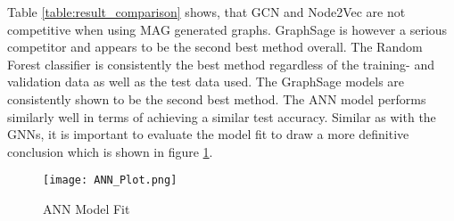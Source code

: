   \begin{table}[h]
    \centering
    \caption{Result Comparison}
    \label{table:result_comparison}
  \end{table}

  \noindent Table \ref{table:result_comparison} shows, that GCN and Node2Vec
  are not competitive when using MAG generated graphs. GraphSage is however a 
  serious competitor and appears to be the second best method overall. The
  Random Forest classifier is consistently the best method regardless of the
  training- and validation data as well as the test data used. The GraphSage
  models are consistently shown to be the second best method. The ANN model
  performs similarly well in terms of achieving a similar test accuracy.
  Similar as with the GNNs, it is important to evaluate the model fit to draw a
  more definitive conclusion which is shown in figure \ref{fig:ANN_fit}.

  \begin{figure}[h]
		\centering
		\texttt{[image: ANN\_Plot.png]}
		\caption{ANN Model Fit}
        \label{fig:ANN_fit}
  \end{figure}

